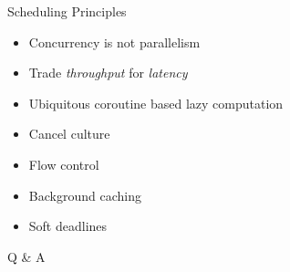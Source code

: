 \documentclass{beamer}
\begin{document}
\begin{frame}{Scheduling Principles}
	
	\begin{itemize}

		\item Concurrency is not parallelism

		\item Trade \textit{throughput} for \textit{latency}

		\item Ubiquitous coroutine based lazy computation

		\item Cancel culture

		\item Flow control

		\item Background caching

		\item Soft deadlines

	\end{itemize}

\end{frame}


\begin{frame}[standout]

	Q \& A

\end{frame}
\end{document}
